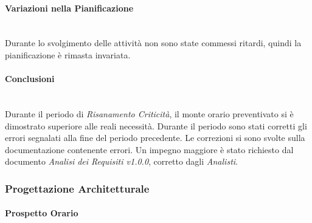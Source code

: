 \paragraph{Variazioni nella Pianificazione} ~\\
Durante lo svolgimento delle attività non sono state commessi ritardi, quindi la pianificazione è rimasta invariata. \\

\paragraph{Conclusioni} ~\\

Durante il periodo di \textit{Risanamento Criticità}, il monte orario preventivato si è dimostrato superiore alle reali necessità. Durante il periodo sono stati corretti gli errori segnalati alla fine del periodo precedente. Le correzioni si sono svolte sulla documentazione contenente errori. Un impegno maggiore è stato richiesto dal documento \textit{Analisi dei Requisiti v1.0.0}, corretto dagli \textit{Analisti}. \\

\newpage

\subsubsection{Progettazione Architetturale}
\label{pa}

\paragraph{Prospetto Orario} ~\\


